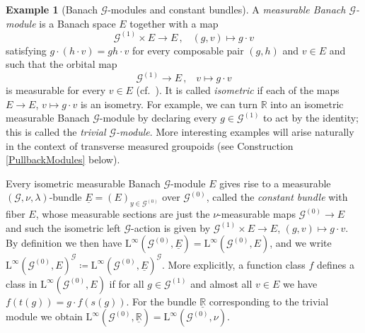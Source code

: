 \documentclass[11pt, oneside]{amsart}
\theoremstyle{definition}
\newtheorem{es}[lemma]{Example}
\newtheorem{no}[lemma]{\S}
\theoremstyle{remark}
\theoremstyle{TheoremNum}
\newcommand{\Linf}{\mathrm{L}^{\infty}}
\newcommand{\Linfw}{\mathrm{L}_{\textup{w}^*}^{\infty}}
\newcommand{\cG}{\mathcal{G}}
\newcommand{\bR}{\mathbb{R}}
\begin{document}
\begin{es}[Banach $\cG$-modules and constant bundles]\label{BanachModule}
A \emph{measurable Banach $\mathcal{G}$-module} is a Banach space $E$ together with a map
$$\mathcal{G}^{(1)}\times E\to E\,,\;\;\; (g,v)\mapsto g\cdot v$$ satisfying $g\cdot (h\cdot v)= gh \cdot v$ for every composable pair $(g,h)$ and $v\in E$ and such that the orbital map 
$$\mathcal{G}^{(1)}\to E\,,\;\;\;v\mapsto g\cdot v$$ is measurable for every $v\in E$ (cf.\  \cite{sarti:savini:23}). It is called \emph{isometric} if each of the maps $E \to E$, $v \mapsto g \cdot v$ is an isometry. 
For example, we can turn $\bR$ into an isometric measurable Banach $\cG$-module by declaring every $g \in \cG^{(1)}$ to act by the identity; this is called the \emph{trivial $\mathcal{G}$-module}. More interesting examples will arise naturally in the 
context of transverse measured groupoids (see Construction \ref{PullbackModules} below).

\item Every isometric measurable Banach $\mathcal{G}$-module $E$ gives rise to a measurable $(\cG, \nu, \lambda)$-bundle $\underline{E} = (E)_{y\in \mathcal{G}^{(0)}}$ over $\cG^{(0)}$, called the \emph{constant bundle} with fiber $E$, 
whose measurable sections are just the $\nu$-measurable maps $\mathcal{G}^{(0)}\to E$ and such the isometric left $\cG$-action is given by $\cG^{(1)} \times E \to E$, $(g,v) \mapsto g \cdot v$. By definition we then have
$\Linf(\cG^{(0)}, \underline{E}) = \Linf(\cG^{(0)}, E)$, and we write $\Linf(\cG^{(0)}, E)^{\cG} \coloneqq \Linf(\cG^{(0)}, \underline{E})^{\cG}$. More explicitly, a function class $f$ defines a class in
$\Linf(\cG^{(0)}, E)$ if for all $g \in \cG^{(1)}$ and almost all $v \in E$ we have $f(t(g)) = g \cdot f(s(g))$.
 For the bundle $\underline{\bR}$ corresponding to the trivial module we obtain
$\Linf(\mathcal{G}^{(0)}, \underline{\bR}) =\Linf(\cG^{(0)}, \nu)$.
\end{es}




\end{document}
